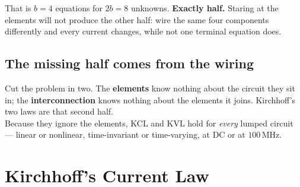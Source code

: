 \documentclass[11pt,a4paper]{article}
\newcommand{\uni}[1]{\,\mathrm{#1}}
\begin{document}
That is $b = 4$ equations for $2b = 8$ unknowns. \textbf{Exactly half.} Staring at the
elements will not produce the other half: wire the same four components differently and
every current changes, while not one terminal equation does.

\subsection{The missing half comes from the wiring}

\begin{center}
\end{center}

\begin{ideabox}
Cut the problem in two. The \textbf{elements} know nothing about the circuit they sit in;
the \textbf{interconnection} knows nothing about the elements it joins. Kirchhoff's two
laws are that second half.\\[3pt]
Because they ignore the elements, KCL and KVL hold for \emph{every} lumped circuit ---
linear or nonlinear, time-invariant or time-varying, at DC or at $100\uni{MHz}$.
\end{ideabox}


\section{Kirchhoff's Current Law}
\end{document}
